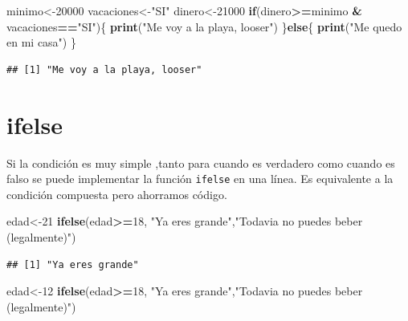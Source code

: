 \documentclass[
]{book}
\newenvironment{Shaded}{\begin{snugshade}}{\end{snugshade}}
\newcommand{\ControlFlowTok}[1]{\textcolor[rgb]{0.13,0.29,0.53}{\textbf{#1}}}
\newcommand{\DecValTok}[1]{\textcolor[rgb]{0.00,0.00,0.81}{#1}}
\newcommand{\FunctionTok}[1]{\textcolor[rgb]{0.13,0.29,0.53}{\textbf{#1}}}
\newcommand{\NormalTok}[1]{#1}
\newcommand{\OtherTok}[1]{\textcolor[rgb]{0.56,0.35,0.01}{#1}}
\newcommand{\SpecialCharTok}[1]{\textcolor[rgb]{0.81,0.36,0.00}{\textbf{#1}}}
\newcommand{\StringTok}[1]{\textcolor[rgb]{0.31,0.60,0.02}{#1}}
\begin{document}
\begin{Shaded}
\begin{Highlighting}[]
\NormalTok{minimo}\OtherTok{\textless{}{-}}\DecValTok{20000}
\NormalTok{vacaciones}\OtherTok{\textless{}{-}}\StringTok{"SI"}
\NormalTok{dinero}\OtherTok{\textless{}{-}}\DecValTok{21000}
\ControlFlowTok{if}\NormalTok{(dinero}\SpecialCharTok{\textgreater{}=}\NormalTok{minimo }\SpecialCharTok{\&}\NormalTok{ vacaciones}\SpecialCharTok{==}\StringTok{"SI"}\NormalTok{)\{}
  \FunctionTok{print}\NormalTok{(}\StringTok{"Me voy a la playa, looser"}\NormalTok{)}
\NormalTok{\}}\ControlFlowTok{else}\NormalTok{\{}
  \FunctionTok{print}\NormalTok{(}\StringTok{"Me quedo en mi casa"}\NormalTok{)}
\NormalTok{\}}
\end{Highlighting}
\end{Shaded}

\begin{verbatim}
## [1] "Me voy a la playa, looser"
\end{verbatim}

\section{ifelse}\label{ifelse}

Si la condición es muy simple ,tanto para cuando es verdadero como cuando es falso se puede implementar la función \texttt{ifelse} en una línea. Es equivalente a la condición compuesta pero ahorramos código.

\begin{Shaded}
\begin{Highlighting}[]
\NormalTok{edad}\OtherTok{\textless{}{-}}\DecValTok{21}
\FunctionTok{ifelse}\NormalTok{(edad}\SpecialCharTok{\textgreater{}=}\DecValTok{18}\NormalTok{, }\StringTok{"Ya eres grande"}\NormalTok{,}\StringTok{"Todavia no puedes beber (legalmente)"}\NormalTok{)}
\end{Highlighting}
\end{Shaded}

\begin{verbatim}
## [1] "Ya eres grande"
\end{verbatim}

\begin{Shaded}
\begin{Highlighting}[]
\NormalTok{edad}\OtherTok{\textless{}{-}}\DecValTok{12}
\FunctionTok{ifelse}\NormalTok{(edad}\SpecialCharTok{\textgreater{}=}\DecValTok{18}\NormalTok{, }\StringTok{"Ya eres grande"}\NormalTok{,}\StringTok{"Todavia no puedes beber (legalmente)"}\NormalTok{)}
\end{Highlighting}
\end{Shaded}
\end{document}
